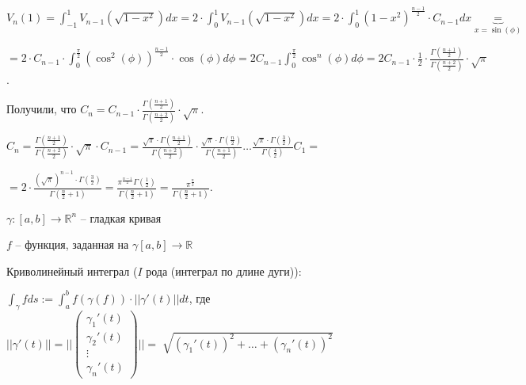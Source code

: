 \begin{example}
\begin{enumerate}
{            $V_n(1) = \int_{-1}^{1} {V_{n - 1} \left( \sqrt{1 - x^2} \right) dx} = 2 \cdot \int_{0}^{1} { V_{n - 1} \left(\sqrt{1 - x^2}\right) dx } = 2 \cdot \int_{0}^{1} { \left(1 - x^2\right)^{\frac{n-1}{2}} \cdot C_{n-1} dx } \underbrace{=}_{x = \sin(\phi)}$
            
            $= 2 \cdot C_{n - 1} \cdot \int_{0}^{\frac{\pi}{2}} { \left(\cos^2(\phi)\right)^{\frac{n - 1}{2}} \cdot \cos(\phi) d \phi } = 2 C_{n - 1} \int_{0}^{\frac{\pi}{2}} { \cos^n(\phi) d\phi } = 2 C_{n - 1} \cdot \frac{1}{2} \cdot \frac{\Gamma\left(\frac{n+1}{2}\right)}{\Gamma\left(\frac{n+2}{2}\right)} \cdot \sqrt{\pi}$.

            Получили, что $C_n = C_{n - 1} \cdot \frac{\Gamma\left(\frac{n+1}{2}\right)}{\Gamma\left(\frac{n+2}{2}\right)} \cdot \sqrt{\pi}$.

            $C_n = \frac{\Gamma\left(\frac{n+1}{2}\right)}{\Gamma\left(\frac{n+2}{2}\right)} \cdot \sqrt{\pi} \cdot C_{n - 1} = \frac{\sqrt{\pi} \cdot \Gamma\left(\frac{n+1}{2}\right)}{\Gamma\left(\frac{n+2}{2}\right)} \cdot \frac{\sqrt{\pi} \cdot \Gamma\left(\frac{n}{2}\right)}{\Gamma\left(\frac{n+1}{2}\right)} \dots \frac{\sqrt{\pi} \cdot \Gamma\left(\frac{3}{2}\right)}{\Gamma\left(\frac{4}{2}\right)} C_1 = $

            $= 2 \cdot \frac{(\sqrt{\pi})^{n - 1} \cdot \Gamma\left(\frac{3}{2}\right)}{\Gamma\left(\frac{n}{2} + 1\right)} = \frac{\pi^{\frac{n-1}{2}} \Gamma\left(\frac{1}{2}\right)}{\Gamma\left( \frac{n}{2} + 1 \right)} = \frac{\pi^{\frac{n}{2}}}{\Gamma\left( \frac{n}{2} + 1 \right)}$.
        }
    \end{enumerate}
\end{example}


\begin{definition}
    $\gamma: [a, b] \to \mathbb{R}^n$ -- гладкая кривая

    $f$ -- функция, заданная на $\gamma[a, b] \to \mathbb{R}$

    Криволинейный интеграл ($I$ рода (интеграл по длине дуги)): 

    $\int_{\gamma}^{}fds := \int_{a}^{b}f(\gamma(f))\cdot ||\gamma'(t)||dt$, где $||\gamma'(t)|| = ||\begin{pmatrix}
        \gamma_1'(t)\\
        \gamma_2'(t)\\
        \vdots\\
        \gamma_n'(t)
    \end{pmatrix}|| = \sqrt[]{(\gamma_1'(t))^2 + \dots + (\gamma_n'(t))^2}$
\end{definition}

